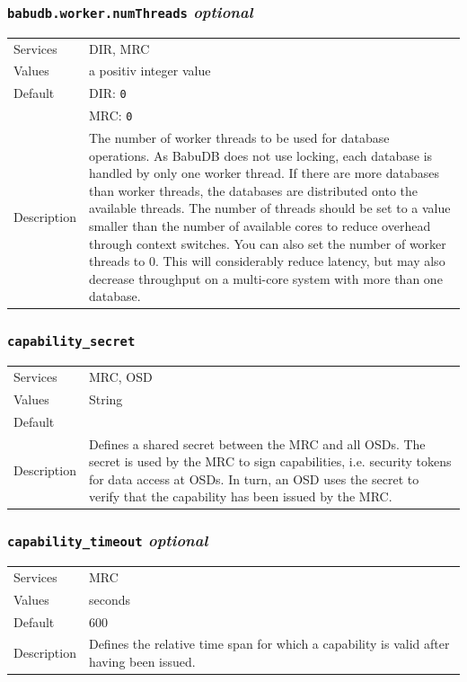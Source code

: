\documentclass[a4paper,10pt]{book}
\begin{document}
\subsubsection{\texttt{babudb.worker.numThreads} \textit{optional}}
\begin{tabular}{lp{10cm}}
 Services & DIR, MRC\\
 Values   & a positiv integer value\\
 Default  & DIR: \texttt{0}\\
          & MRC: \texttt{0}\\
 Description & The number of worker threads to be used for database operations. As BabuDB does not use locking, each database is handled by only one worker thread. If there are more databases than worker threads, the databases are distributed onto the available threads. The number of threads should be set to a value smaller than the number of available cores to reduce overhead through context switches. You can also set the number of worker threads to 0. This will considerably reduce latency, but may also decrease throughput on a multi-core system with more than one database.
\end{tabular}

\subsubsection{\texttt{capability\_secret}}
\begin{tabular}{lp{10cm}}
 Services & MRC, OSD\\
 Values   & String \\
 Default  & \\
 Description & Defines a shared secret between the MRC and all OSDs. The secret is used by the MRC to sign capabilities, i.e. security tokens for data access at OSDs. In turn, an OSD uses the secret to verify that the capability has been issued by the MRC.
\end{tabular}

\subsubsection{\texttt{capability\_timeout} \textit{optional}}
\begin{tabular}{lp{10cm}}
 Services & MRC\\
 Values   & seconds\\
 Default  & 600\\
 Description & Defines the relative time span for which a capability is valid after having been issued.
\end{tabular}
\end{document}
